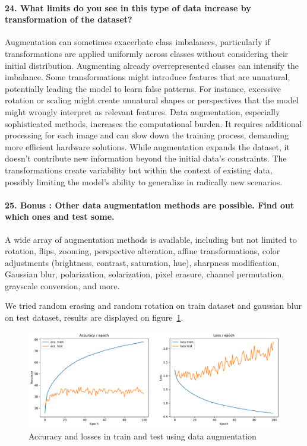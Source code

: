 \documentclass{article}
\theoremstyle{plain}%
\theoremstyle{definition}
\theoremstyle{remark}
\begin{document}
\paragraph{24. What limits do you see in this type of data increase by transformation of the dataset?}
Augmentation can sometimes exacerbate class imbalances, particularly if transformations are applied uniformly across classes without considering their initial distribution. Augmenting already overrepresented classes can intensify the imbalance. Some transformations might introduce features that are unnatural, potentially leading the model to learn false patterns. For instance, excessive rotation or scaling might create unnatural shapes or perspectives that the model might wrongly interpret as relevant features. Data augmentation, especially sophisticated methods, increases the computational burden. It requires additional processing for each image and can slow down the training process, demanding more efficient hardware solutions. While augmentation expands the dataset, it doesn't contribute new information beyond the initial data's constraints. The transformations create variability but within the context of existing data, possibly limiting the model's ability to generalize in radically new scenarios.

\paragraph{25. Bonus : Other data augmentation methods are possible. Find out which ones and test some.}
A wide array of augmentation methods is available, including but not limited to rotation, flips, zooming, perspective alteration, affine transformations, color adjustments (brightness, contrast, saturation, hue), sharpness modification, Gaussian blur, polarization, solarization, pixel erasure, channel permutation, grayscale conversion, and more.

We tried random erasing and random rotation on train dataset and gaussian blur on test dataset, results are displayed on figure~\ref{fig:dataincrease_bis}. 

\begin{figure}[H]
    \centering
    \includegraphics*[width=\textwidth]{figs/CNN/dataincrease_bis.pdf}
    \caption{Accuracy and losses in train and test using data augmentation}
    \label{fig:dataincrease_bis}
\end{figure}
\end{document}
